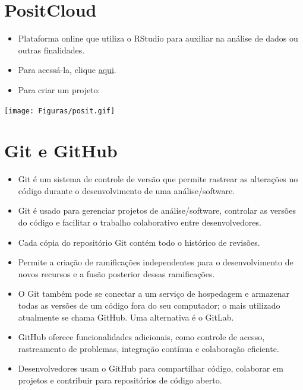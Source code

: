 \documentclass[
  letterpaper,
  DIV=11,
  numbers=noendperiod]{scrartcl}
\begin{document}
\section{PositCloud}\label{positcloud}

\begin{itemize}
\item
  Plataforma online que utiliza o RStudio para auxiliar na análise de
  dados ou outras finalidades.
\item
  Para acessá-la, clique
  \href{https://login.posit.cloud/login?redirect=\%2F}{aqui}.
\item
  Para criar um projeto:
\end{itemize}

\texttt{[image: Figuras/posit.gif]}

\section{Git e GitHub}\label{git-e-github}

\begin{itemize}
\item
  Git é um sistema de controle de versão que permite rastrear as
  alterações no código durante o desenvolvimento de uma
  análise/software.
\item
  Git é usado para gerenciar projetos de análise/software, controlar as
  versões do código e facilitar o trabalho colaborativo entre
  desenvolvedores.
\item
  Cada cópia do repositório Git contém todo o histórico de revisões.
\item
  Permite a criação de ramificações independentes para o desenvolvimento
  de novos recursos e a fusão posterior dessas ramificações.
\item
  O Git também pode se conectar a um serviço de hospedagem e armazenar
  todas as versões de um código fora do seu computador; o mais utilizado
  atualmente se chama GitHub. Uma alternativa é o GitLab.
\item
  GitHub oferece funcionalidades adicionais, como controle de acesso,
  rastreamento de problemas, integração contínua e colaboração
  eficiente.
\item
  Desenvolvedores usam o GitHub para compartilhar código, colaborar em
  projetos e contribuir para repositórios de código aberto.
\end{itemize}
\end{document}
